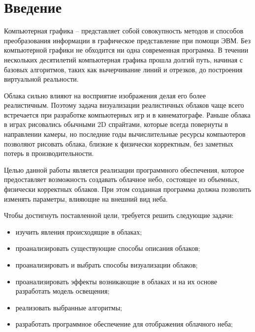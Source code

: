 \section*{Введение}

Компьютерная графика – представляет собой совокупность методов
и способов преобразования информации в графическое представление при
помощи ЭВМ. Без компьютерной графики не обходится ни одна современная
программа. В течении нескольких десятилетий компьютерная графика прошла
долгий путь, начиная с базовых алгоритмов, таких как вычерчивание линий
и отрезков, до построения виртуальной реальности.

Облака сильно влияют на восприятие изображения делая его более реалистичным. Поэтому задача визуализации реалистичных облаков чаще всего встречается при разработке компьютерных игр и в кинематографе. Раньше облака в играх рисовались обычными 2D спрайтами, которые всегда повернуты в направлении камеры, но последние годы вычислительные ресурсы компьютеров позволяют рисовать облака, близкие к физически корректным, без заметных потерь в производительности.

Целью данной работы является реализации программного обеспечения, которое предоставляет возможность создавать облачное небо, состоящее из объемных, физически корректных облаков. При этом созданная программа должна позволить изменять параметры, влияющие на внешний вид неба.

Чтобы достигнуть поставленной цели, требуется решить следующие задачи:

\begin{itemize}
	\item изучить явления происходящие в облаках;
	\item проанализировать существующие способы описания облаков;
	\item проанализировать и выбрать способы визуализации облаков;
	\item проанализировать эффекты возникающие в облаках и на их основе разработать модель освещения;
	\item реализовать выбранные алгоритмы;
	\item разработать программное обеспечение для отображения облачного неба;
\end{itemize}